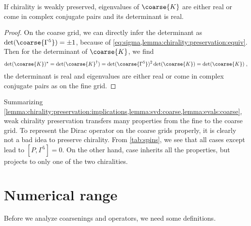 \begin{lemma} \label{lemma:evals:coarse}
If chirality is weakly preserved, eigenvalues of $\coarse{K}$ are either real or come in complex conjugate pairs and its determinant is real.
\end{lemma}

\begin{proof}
On the coarse grid, we can directly infer the determinant as $\det(\coarse{\Gamma^{5}}) = \pm 1$, because of \cref{eq:sigma,lemma:chirality:preservation:equiv}.
Then for the determinant of $\coarse{K}$, we find
\begin{equation}
\det(\coarse{K})^{\star} =
\det(\coarse{K}^{\dagger}) =
\det(\coarse{\Gamma^{5}})^{2} \det(\coarse{K}) =
\det(\coarse{K}) \;,
\end{equation}
\ie the determinant is real and eigenvalues are either real or come in complex conjugate pairs as on the fine grid.
\end{proof}


Summarizing \cref{lemma:chirality:preservation:implications,lemma:svd:coarse,lemma:evals:coarse}, weak chirality preservation transfers many properties from the fine to the coarse grid.
To represent the Dirac operator on the coarse grids properly, it is clearly not a bad idea to preserve chirality.
From \cref{tab:spins}, we see that all cases except  lead to $[P, \Gamma^{5}]=0$.
On the other hand, case  inherits all the properties, but projects to only one of the two chiralities.

\section{Numerical range}

Before we analyze coarsenings and operators, we need some definitions.

